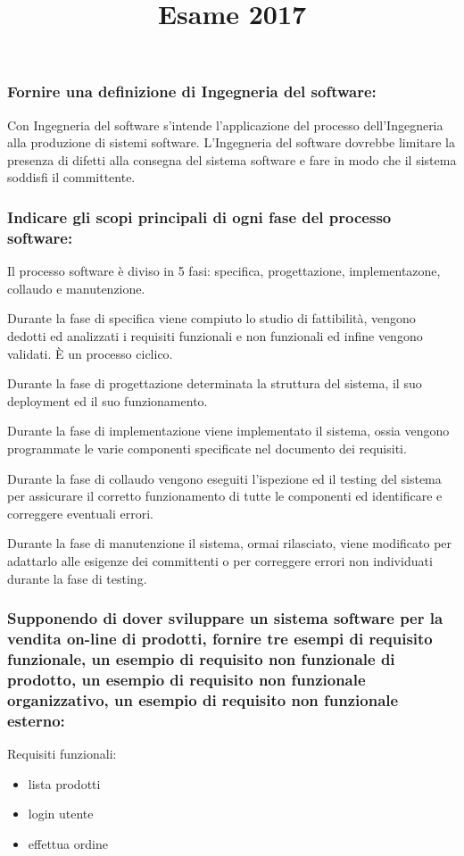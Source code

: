 \documentclass[11pt]{article}
\title{Esame 2017}
\begin{document}
\subsubsection*{Fornire una definizione di Ingegneria del software:}
Con Ingegneria del software s'intende l'applicazione del processo dell'Ingegneria alla produzione di sistemi software. 
L'Ingegneria del software dovrebbe limitare la presenza di difetti alla consegna del sistema software e fare in modo che
il sistema soddisfi il committente.
\subsubsection*{Indicare gli scopi principali di ogni fase del processo software:}
Il processo software è diviso in 5 fasi: specifica, progettazione, implementazone, collaudo e manutenzione.

Durante la fase di specifica viene compiuto lo studio di fattibilità, vengono dedotti ed analizzati i requisiti funzionali 
e non funzionali ed infine vengono validati. È un processo ciclico.

Durante la fase di progettazione determinata la struttura del sistema, il suo deployment ed il suo funzionamento.

Durante la fase di implementazione viene implementato il sistema, ossia vengono programmate le varie componenti specificate 
nel documento dei requisiti.

Durante la fase di collaudo vengono eseguiti l'ispezione ed il testing del sistema per assicurare il corretto funzionamento 
di tutte le componenti ed identificare e correggere eventuali errori.

Durante la fase di manutenzione il sistema, ormai rilasciato, viene modificato per adattarlo alle esigenze dei 
committenti o per correggere errori non individuati durante la fase di testing.
\subsubsection*{Supponendo di dover sviluppare un sistema software per la vendita on-line di prodotti, fornire tre
esempi di requisito funzionale, un esempio di requisito non funzionale di prodotto, un esempio di
requisito non funzionale organizzativo, un esempio di requisito non funzionale esterno:}
Requisiti funzionali:
\begin{itemize}
    \item lista prodotti 
    \item login utente
    \item effettua ordine
\end{itemize}
\end{document}
